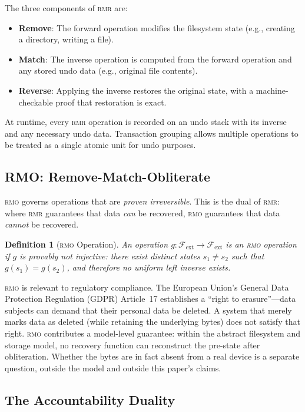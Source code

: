 \documentclass[11pt,a4paper]{article}
\newtheorem{definition}[theorem]{Definition}
\newcommand{\FS}{\mathcal{F}}
\newcommand{\rmr}{\textsc{rmr}}
\newcommand{\rmo}{\textsc{rmo}}
\begin{document}
The three components of \rmr{} are:
\begin{itemize}
  \item \textbf{Remove}: The forward operation modifies the filesystem state
        (e.g., creating a directory, writing a file).
  \item \textbf{Match}: The inverse operation is computed from the forward
        operation and any stored undo data (e.g., original file contents).
  \item \textbf{Reverse}: Applying the inverse restores the original state,
        with a machine-checkable proof that restoration is exact.
\end{itemize}

At runtime, every \rmr{} operation is recorded on an undo stack with its
inverse and any necessary undo data. Transaction grouping allows multiple
operations to be treated as a single atomic unit for undo purposes.

\subsection{RMO: Remove-Match-Obliterate}

\rmo{} governs operations that are \emph{proven irreversible}. This is the
dual of \rmr{}: where \rmr{} guarantees that data \emph{can} be recovered,
\rmo{} guarantees that data \emph{cannot} be recovered.

\begin{definition}[\rmo{} Operation]
\label{def:rmo}
An operation $g : \FS_{\text{ext}} \to \FS_{\text{ext}}$ is an \rmo{}
operation if $g$ is provably \emph{not injective}: there exist distinct states
$s_1 \neq s_2$ such that $g(s_1) = g(s_2)$, and therefore no uniform left
inverse exists.
\end{definition}

\rmo{} is relevant to regulatory compliance. The European Union's General
Data Protection Regulation (GDPR) Article~17 establishes a ``right to
erasure''---data subjects can demand that their personal data be deleted. A
system that merely marks data as deleted (while retaining the underlying
bytes) does not satisfy that right. \rmo{} contributes a model-level
guarantee: within the abstract filesystem and storage model, no recovery
function can reconstruct the pre-state after obliteration. Whether the bytes
are in fact absent from a real device is a separate question, outside the
model and outside this paper's claims.

\subsection{The Accountability Duality}
\end{document}
